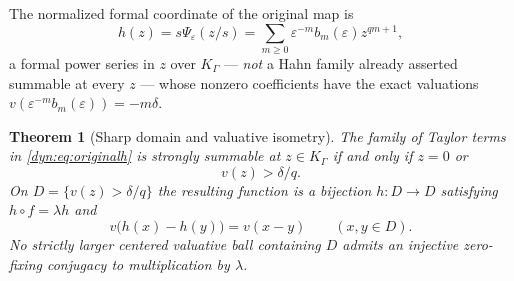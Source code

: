 \documentclass[11pt,letterpaper]{article}
\newtheorem{theorem}{Theorem}[section]
\theoremstyle{definition}
\theoremstyle{remark}
\newcommand{\eps}{\varepsilon}
\numberwithin{equation}{section}
\begin{document}
The normalized formal coordinate of the original map is
\begin{equation}\label{dyn:eq:originalh}
 h(z)=s\Psi_\eps(z/s)=\sum_{m\ge0}\eps^{-m}b_m(\eps)z^{qm+1},
\end{equation}
a formal power series in $z$ over $K_\Gamma$ --- \emph{not} a Hahn family
already asserted summable at every $z$ --- whose nonzero coefficients have
the exact valuations $v(\eps^{-m}b_m(\eps))=-m\delta$.

\begin{theorem}[Sharp domain and valuative isometry]\label{dyn:thm:sharp}
The family of Taylor terms in \eqref{dyn:eq:originalh} is strongly summable
at $z\in K_\Gamma$ if and only if $z=0$ or
\begin{equation}\label{dyn:eq:sharpdomain}
 v(z)>\delta/q .
\end{equation}
On $D=\{v(z)>\delta/q\}$ the resulting function is a bijection
$h:D\to D$ satisfying $h\circ f=\lambda h$ and
\begin{equation}\label{dyn:eq:isometry}
 v\bigl(h(x)-h(y)\bigr)=v(x-y)\qquad(x,y\in D).
\end{equation}
No strictly larger centered valuative ball containing $D$ admits an
injective zero-fixing conjugacy to multiplication by $\lambda$.
\end{theorem}
\end{document}
